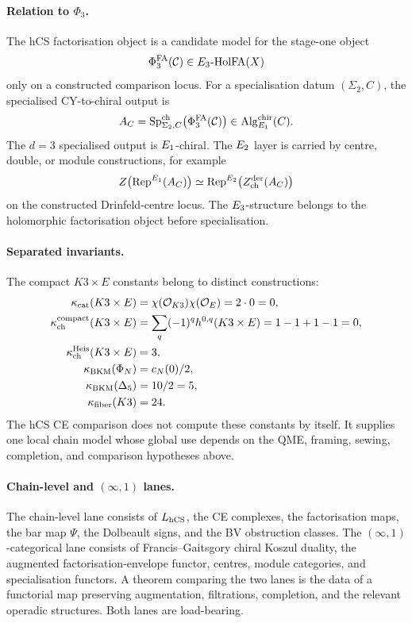 \paragraph{Relation to \texorpdfstring{\(\Phi_3\)}{Phi3}.}
The hCS factorisation object is a candidate model for the stage-one
object
\[
  \Phi^{\mathrm{FA}}_3(\mathcal C)\in E_3\text{-}\mathrm{HolFA}(X)
\]
only on a constructed comparison locus. For a specialisation datum
\((\Sigma_2,C)\), the specialised CY-to-chiral output is
\[
  A_C
  =
  \mathrm{Sp}^{\mathrm{ch}}_{\Sigma_2,C}\bigl(\Phi^{\mathrm{FA}}_3(\mathcal C)\bigr)
  \in
  \mathrm{Alg}^{\mathrm{chir}}_{E_1}(C).
\]
The \(d=3\) specialised output is \(E_1\)-chiral. The \(E_2\) layer
is carried by centre, double, or module constructions, for example
\[
  Z\bigl(\mathrm{Rep}^{E_1}(A_C)\bigr)
  \simeq
  \mathrm{Rep}^{E_2}\bigl(Z^{\mathrm{der}}_{\mathrm{ch}}(A_C)\bigr)
\]
on the constructed Drinfeld-centre locus. The \(E_3\)-structure
belongs to the holomorphic factorisation object before specialisation.

\paragraph{Separated invariants.}
The compact \(K3\times E\) constants belong to distinct constructions:
\[
\begin{aligned}
  \kappa_{\mathrm{cat}}(K3\times E)
    &=\chi(\mathcal{O}_{K3})\chi(\mathcal{O}_E)=2\cdot0=0,\\
  \kappa_{\mathrm{ch}}^{\mathrm{compact}}(K3\times E)
    &=\sum_q(-1)^q h^{0,q}(K3\times E)=1-1+1-1=0,\\
  \kappa_{\mathrm{ch}}^{\mathrm{Heis}}(K3\times E)
    &=3,\\
  \kappa_{\mathrm{BKM}}(\Phi_N)
    &=c_N(0)/2,\\
  \kappa_{\mathrm{BKM}}(\Delta_5)
    &=10/2=5,\\
  \kappa_{\mathrm{fiber}}(K3)
    &=24.
\end{aligned}
\]
The hCS CE comparison does not compute these constants by itself. It
supplies one local chain model whose global use depends on the QME,
framing, sewing, completion, and comparison hypotheses above.

\paragraph{Chain-level and \texorpdfstring{\((\infty,1)\)}{(infinity,1)} lanes.}
The chain-level lane consists of \(L_{\mathrm{hCS}}\), the CE complexes, the
factorisation maps, the bar map \(\Psi\), the Dolbeault signs, and the
BV obstruction classes. The \((\infty,1)\)-categorical lane consists of
Francis--Gaitsgory chiral Koszul duality, the augmented
factorisation-envelope functor, centres, module categories, and
specialisation functors. A theorem comparing the two lanes is the data
of a functorial map preserving augmentation, filtrations, completion,
and the relevant operadic structures. Both lanes are load-bearing.


